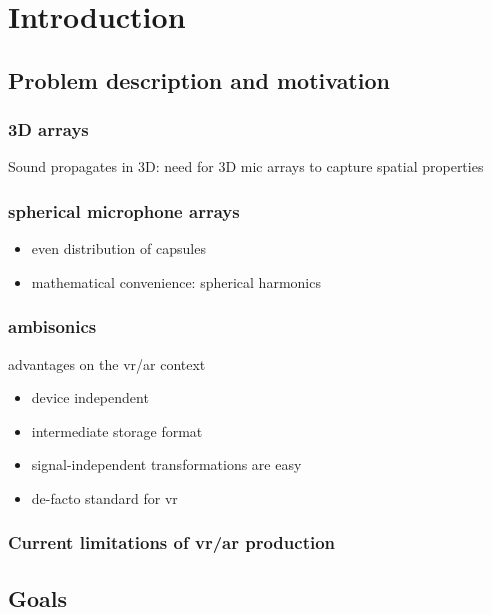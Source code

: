 \chapter{Introduction}


\section{Problem description and motivation}

\subsection{3D arrays}

Sound propagates in 3D: need for 3D mic arrays to capture spatial properties



\subsection{spherical microphone arrays}

\begin{itemize}
  \item even distribution of capsules
  \item mathematical convenience: spherical harmonics
\end{itemize}



\subsection{ambisonics}


advantages on the vr/ar context
\begin{itemize}
  \item device independent
  \item intermediate storage format
  \item signal-independent transformations are easy
  \item de-facto standard for vr
\end{itemize}

\subsection{Current limitations of vr/ar production}


\section{Goals}

